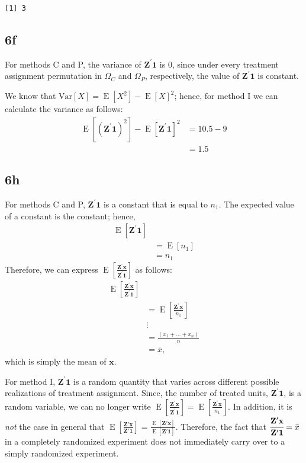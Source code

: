 \documentclass[
  12pt,
  leqno]{article}
\DeclareMathOperator{\E}{\mathrm{E}}
\DeclareMathOperator{\1}{\mathbbm{1}}
\begin{document}
\begin{verbatim}
[1] 3
\end{verbatim}

\normalsize

\subsection*{6f}

For methods C and P, the variance of \(\mathbf{Z}^{\prime} \mathbf{1}\)
is \(0\), since under every treatment assignment permutation in
\(\Omega_C\) and \(\Omega_P\), respectively, the value of
\(\mathbf{Z}^{\prime}\mathbf{1}\) is constant.

We know that
\(\mathrm{Var}\left[X\right] = \E\left[X^2\right] - \E\left[X\right]^2\);
hence, for method I we can calculate the variance as follows:
\begin{align*}
\E\left[\left(\mathbf{Z}^{\prime}\mathbf{1}\right)^2\right] - \E\left[\mathbf{Z}^{\prime}\mathbf{1}\right]^2 & = 10.5 - 9 \\
& = 1.5
\end{align*}

\subsection*{6h}

For methods C and P, \(\mathbf{Z}^{\prime}\mathbf{1}\) is a constant
that is equal to \(n_1\). The expected value of a constant is the
constant; hence, \begin{align*}
\E\left[\mathbf{Z}^{\prime}\mathbf{1}\right] \\
& = \E\left[n_1\right] \\
& = n_1
\end{align*} Therefore, we can express
\(\E\left[\frac{\mathbf{Z}^{\prime}\mathbf{x}}{\mathbf{Z}^{\prime}\mathbf{1}}\right]\)
as follows: \begin{align*}
\E\left[\frac{\mathbf{Z}^{\prime}\mathbf{x}}{\mathbf{Z}^{\prime}\mathbf{1}}\right] \\
& = \E\left[\frac{\mathbf{Z}^{\prime}\mathbf{x}}{n_1}\right] \\
& \vdots  \\
& = \frac{\left(x_1 + \dots + x_n\right)}{n} \\
& = \overline{x},
\end{align*} which is simply the mean of \(\mathbf{x}\).

For method I, \(\mathbf{Z}^{\prime}\mathbf{1}\) is a random quantity
that varies across different possible realizations of treatment
assignment. Since, the number of treated units,
\(\mathbf{Z}^{\prime}\mathbf{1}\), is a random variable, we can no
longer write
\(\E\left[\frac{\mathbf{Z}^{\prime}\mathbf{x}}{\mathbf{Z}^{\prime}\mathbf{1}}\right] = \E\left[\frac{\mathbf{Z}^{\prime}\mathbf{x}}{n_1}\right]\).
In addition, it is \textit{not} the case in general that
\(\E\left[\frac{\mathbf{Z}'\mathbf{x}}{\mathbf{Z}'\mathbf{1}} \right] = \frac{\E\left[\mathbf{Z}'\mathbf{x} \right]}{\E\left[\mathbf{Z}'\mathbf{1} \right]}\).
Therefore, the fact that
\(\cfrac{\mathbf{Z}'\mathbf{x}}{\mathbf{Z}'\mathbf{1}} = \bar{x}\) in a
completely randomized experiment does not immediately carry over to a
simply randomized experiment.
\end{document}
